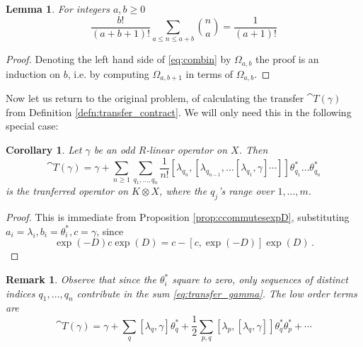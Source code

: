 \documentclass[english,letter paper,12pt,leqno]{article}
\newtheorem{lemma}[theorem]{Lemma}
\newtheorem{corollary}[theorem]{Corollary}
\theoremstyle{example}
\newtheorem{remark}[theorem]{Remark}
\numberwithin{equation}{section}
\def\be{\begin{equation}}
\def\ee{\end{equation}}
\DeclareMathOperator{\At}{At}
\begin{document}
\begin{lemma}\label{lemma:combin} For integers $a, b \ge 0$
\begin{equation}\label{eq:combin}
\frac{b!}{(a+b+1)!} \sum_{a \le n \le a + b} \binom{n}{a} = \frac{1}{(a+1)!}
\end{equation}
\end{lemma}
\begin{proof}
Denoting the left hand side of \eqref{eq:combin} by $\Omega_{a,b}$ the proof is an induction on $b$, i.e. by computing $\Omega_{a,b+1}$ in terms of $\Omega_{a,b}$.
\end{proof}

Now let us return to the original problem, of calculating the transfer $\cat{T}(\gamma)$ from Definition \ref{defn:transfer_contract}. We will only need this in the following special case:

\begin{corollary}\label{corollary_transfergamma} Let $\gamma$ be an odd $R$-linear operator on $X$. Then
\be\label{eq:transfer_gamma}
\cat{T}(\gamma) = \gamma + \sum_{n \ge 1} \sum_{q_1,\ldots,q_n}  \frac{1}{n!} [\lambda_{q_n}, [\lambda_{q_{n-1}}, \ldots [ \lambda_{q_1}, \gamma] \cdots ]] \theta^*_{q_1} \ldots \theta^*_{q_n}
\ee
is the tranferred operator on $K \otimes X$, where the $q_j$'s range over $1, \ldots, m$.
\end{corollary}
\begin{proof}
This is immediate from Proposition \ref{prop:ccommutesexpD}, substituting $a_i = \lambda_i, b_i = \theta_i^*,c = \gamma$, since
\[
\exp(-D) c \exp(D) = c - [c, \exp(-D)] \exp(D)\,.
\]
\end{proof}


\begin{remark} Observe that since the $\theta_i^*$ square to zero, only sequences of distinct indices $q_1,\ldots,q_n$ contribute in the sum \eqref{eq:transfer_gamma}. The low order terms are
\be
\cat{T}(\gamma) = \gamma + \sum_q [\lambda_q, \gamma] \theta^*_q + \frac{1}{2} \sum_{p,q} [\lambda_p, [\lambda_q, \gamma]] \theta_q^*\theta_p^* + \cdots
\ee
\end{remark}
\end{document}
